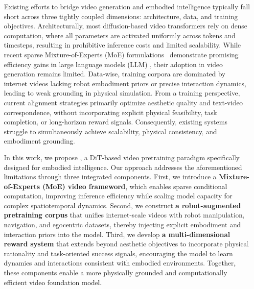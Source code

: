 Existing efforts to bridge video generation and embodied intelligence typically fall short across three tightly coupled dimensions: architecture, data, and training objectives. Architecturally, most diffusion-based video transformers rely on dense computation, where all parameters are activated uniformly across tokens and timesteps, resulting in prohibitive inference costs and limited scalability. While recent sparse Mixture-of-Experts (MoE) formulations~\cite{deepseek2024v3,lepikhin2020gshard} demonstrate promising efficiency gains in large language models (LLM) \cite{achiam2023gpt,touvron2023llama,team2023gemini,bai2023qwen,bi2024deepseek,zeng2022glm}, their adoption in video generation remains limited. 
Data-wise, training corpora are dominated by internet videos lacking robot embodiment priors or precise interaction dynamics, leading to weak grounding in physical simulation.
From a training perspective, current alignment strategies primarily optimize aesthetic quality and text-video correspondence, without incorporating explicit physical feasibility, task completion, or long-horizon reward signals. Consequently, existing systems struggle to simultaneously achieve scalability, physical consistency, and embodiment grounding.


In this work, we propose \method, a DiT-based video pretraining paradigm specifically designed for embodied intelligence. Our approach addresses the aforementioned limitations through three integrated components. First, we introduce a \textbf{Mixture-of-Experts (MoE) video frameword}, which enables sparse conditional computation, improving inference efficiency while scaling model capacity for complex spatiotemporal dynamics. Second, we construct \textbf{a robot-augmented pretraining corpus} that unifies internet-scale videos with robot manipulation, navigation, and egocentric datasets, thereby injecting explicit embodiment and interaction priors into the model. Third, we develop \textbf{a multi-dimensional reward system} that extends beyond aesthetic objectives to incorporate physical rationality and task-oriented success signals, encouraging the model to learn dynamics and interactions consistent with embodied environments. Together, these components enable a more physically grounded and computationally efficient video foundation model.

